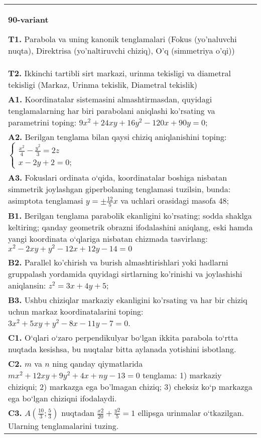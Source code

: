 \documentclass{article}
\begin{document}
\begin{tabular}{m{17cm}}
\textbf{90-variant}
\newline

\textbf{T1.} Parabola va uning kanonik tenglamalari (Fokus (yo’naluvchi nuqta), Direktrisa (yo’naltiruvchi chiziq), O’q (simmetriya o’qi)) \\
\textbf{T2.} Ikkinchi tartibli sirt markazi, urinma tekisligi va diametral tekisligi (Markaz, Urinma tekislik, Diametral tekislik) \\
\textbf{A1.} Koordinatalar sistemasini almashtirmasdan, quyidagi tenglamalarning har biri parabolani aniqlashi ko'rsating va parametrini toping: $9 x^2+24 x y+16 y^2-120 x+90 y=0$; \\
\textbf{A2.} Berilgan tenglama bilan qaysi chiziq aniqlanishini toping: $\left\{\begin{array}{l}\frac{x^2}{4}-\frac{y^2}{3}=2 z \\ x-2 y+2=0 ;\end{array}\right.$ \\
\textbf{A3.} Fokuslari ordinata o‘qida, koordinatalar boshiga nisbatan simmetrik joylashgan giperbolaning tenglamasi tuzilsin, bunda: asimptota tenglamasi $y= \pm \frac{12}{5} x$ va uchlari orasidagi masofa 48; \\
\textbf{B1.} Berilgan tenglama parabolik ekanligini ko'rsating; sodda shaklga keltiring; qanday geometrik obrazni ifodalashini aniqlang, eski hamda yangi koordinata o‘qlariga nisbatan chizmada tasvirlang: $x^2-2 x y+y^2-12 x+12 y-14=0$ \\
\textbf{B2.} Parallel ko'chirish va burish almashtirishlari yoki hadlarni gruppalash yordamida quyidagi sirtlarning ko'rinishi va joylashishi aniqlansin: $z^2=3 x+4 y+5$; \\
\textbf{B3.} Ushbu chiziqlar markaziy ekanligini ko'rsating va har bir chiziq uchun markaz koordinatalarini toping: $3x^2+5xy+y^2-8x-11y-7=0$. \\
\textbf{C1.} O‘qlari o‘zaro perpendikulyar bo‘lgan ikkita parabola to‘rtta nuqtada kesishsa, bu nuqtalar bitta aylanada yotishini isbotlang. \\
\textbf{C2.} $m$ va $n$ ning qanday qiymatlarida $m x^2+12 x y+9 y^2+4 x+n y-13=0$ tenglama: 1) markaziy chiziqni; 2) markazga ega bo'lmagan chiziq; 3) cheksiz ko‘p markazga ega bo‘lgan chiziqni ifodalaydi. \\
\textbf{C3.} $A\left(\frac{10}{3}; \frac{5}{3}\right)$ nuqtadan $\frac{x2}{20}+\frac{y2}{5}=1$ ellipsga urinmalar o‘tkazilgan. Ularning tenglamalarini tuzing. \\

\end{tabular}
\vspace{1cm}
\end{document}
